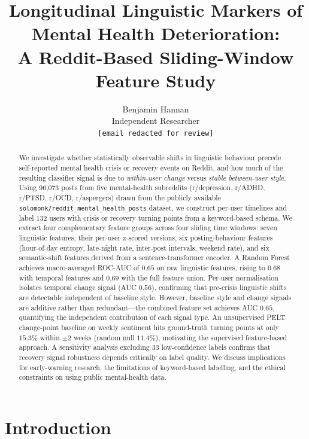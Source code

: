 \documentclass[11pt]{article}
\title{Longitudinal Linguistic Markers of Mental Health Deterioration:\\
       A Reddit-Based Sliding-Window Feature Study}
\author{
  Benjamin Hannan \\
  Independent Researcher \\
  \texttt{[email redacted for review]}
}
\begin{document}
\maketitle

\begin{abstract}
We investigate whether statistically observable shifts in linguistic
behaviour precede self-reported mental health crisis or recovery events
on Reddit, and how much of the resulting classifier signal is due to
\emph{within-user change} versus \emph{stable between-user style}.
Using 96{,}073 posts from five mental-health subreddits
(r/depression, r/ADHD, r/PTSD, r/OCD, r/aspergers) drawn from the
publicly available \texttt{solomonk/reddit\_mental\_health\_posts}
dataset, we construct per-user timelines and label 132 users with
crisis or recovery turning points from a keyword-based schema.
We extract four complementary feature groups across four sliding time
windows: seven linguistic features, their per-user z-scored versions,
six posting-behaviour features (hour-of-day entropy, late-night rate,
inter-post intervals, weekend rate), and six semantic-shift features
derived from a sentence-transformer encoder.
A Random Forest achieves macro-averaged ROC-AUC of $0.65$ on raw
linguistic features, rising to $0.68$ with temporal features and
$0.69$ with the full feature union.
Per-user normalisation isolates temporal change signal (AUC $0.56$),
confirming that pre-crisis linguistic shifts are detectable
independent of baseline style.
However, baseline style and change signals are additive rather than
redundant---the combined feature set achieves AUC $0.65$, quantifying
the independent contribution of each signal type.
An unsupervised PELT change-point baseline on weekly sentiment hits
ground-truth turning points at only $15.3\%$ within $\pm 2$ weeks
(random null $11.4\%$), motivating the supervised feature-based
approach.
A sensitivity analysis excluding 33 low-confidence labels confirms
that recovery signal robustness depends critically on label quality.
We discuss implications for early-warning research, the limitations
of keyword-based labelling, and the ethical constraints on using
public mental-health data.
\end{abstract}

\section{Introduction}
\label{sec:intro}
\end{document}
